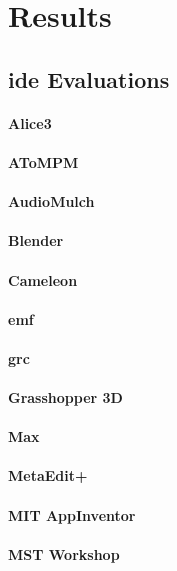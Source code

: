 \section{Results}
\label{sec:results}

\subsection{\acs{ide} Evaluations}

\paragraph{Alice3}
\paragraph{AToMPM}
\paragraph{AudioMulch}
\paragraph{Blender}
\paragraph{Cameleon}
\paragraph{\ac{emf}}
\paragraph{\ac{grc}}
\paragraph{Grasshopper 3D }
\paragraph{Max}
\paragraph{MetaEdit+}
\paragraph{MIT AppInventor}
\paragraph{MST Workshop}
